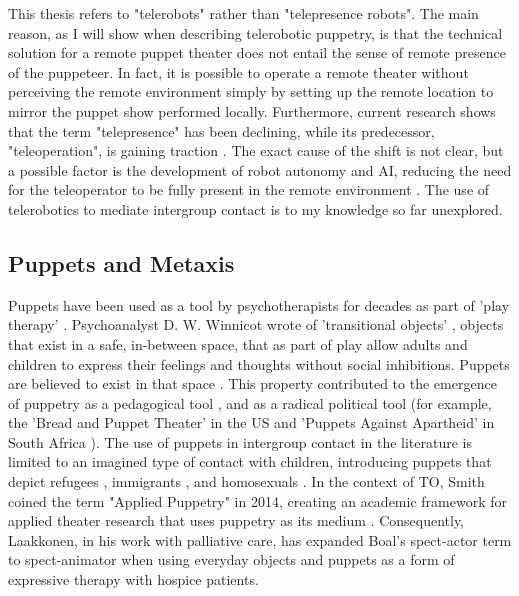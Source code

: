 \documentclass[dissertation,math,vertlayout,pdfa,colorlinks,nologo]{aaltoseries}
\begin{document}
This thesis refers to "telerobots" rather than "telepresence robots". The main reason, as I will show when describing telerobotic puppetry, is that the technical solution for a remote puppet theater does not entail the sense of remote presence of the puppeteer. In fact, it is possible to operate a remote theater without perceiving the remote environment simply by setting up the remote location to mirror the puppet show performed locally. Furthermore, current research shows that the term "telepresence" has been declining, while its predecessor, "teleoperation", is gaining traction \cite{rosa-garciaBridgingRemoteOperations2025}. The exact cause of the shift is not clear, but a possible factor is the development of robot autonomy and AI, reducing the need for the teleoperator to be fully present in the remote environment \cite{darvishTeleoperationHumanoidRobots2023}. The use of telerobotics to mediate intergroup contact is to my knowledge so far unexplored.

\subsection{Puppets and Metaxis}
Puppets have been used as a tool by psychotherapists for decades as part of 'play therapy' \cite{aronoffPuppetryTherapeuticMedium1996}. Psychoanalyst D. W. Winnicot wrote of 'transitional objects' \cite{winnicottPlayingReality1991}, objects that exist in a safe, in-between space, that as part of play allow adults and children to express their feelings and thoughts without social inhibitions. Puppets are believed to exist in that space \cite{triminghamObjectsTransitionPuppet2010, wisniewskaHybridityPuppetry2020}. This property contributed to the emergence of puppetry as a pedagogical tool \cite{krogerPuppetPedagogicalTool2019}, and as a radical political tool (for example, the 'Bread and Puppet Theater' in the US \cite{schumannRadicalityPuppetTheatre1991} and 'Puppets Against Apartheid' in South Africa \cite{krugerPuppetsPoliticsFinding2016}). The use of puppets in intergroup contact in the literature is limited to an imagined type of contact with children, introducing puppets that depict refugees \cite{charalampidouInventingNewRoad2022}, immigrants \cite{jonesNoStringsAttached2020}, and homosexuals \cite{mausKindergartenChildrensAttitudes2025}. In the context of TO, Smith coined the term "Applied Puppetry" in 2014, creating an academic framework for applied theater research that uses puppetry as its medium \cite{purcell-gatesAppliedPuppetryCommunities2020}. Consequently, Laakkonen, in his work with palliative care, has expanded Boal's spect-actor term to spect-animator when using everyday objects and puppets as a form of expressive therapy with hospice patients. 
\end{document}
